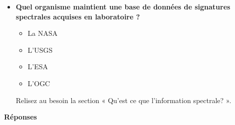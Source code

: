 \documentclass[
  french,
  11pt,
  letterpaper,
  open=any,
  twoside=false,
  french]{scrbook}
\providecommand{\tightlist}{%
  \setlength{\itemsep}{0pt}\setlength{\parskip}{0pt}}
\begin{document}
\begin{itemize}
  \begin{itemize}
  \tightlist
  \item
    Une généralisation de la couleur au-delà des bandes visibles
  \item
    Un histogramme des pixels de l'image
  \item
    La résolution spatiale du capteur
  \item
    Le niveau de bruit du capteur
  \end{itemize}

  Relisez au besoin la section « Qu'est ce que l'information spectrale?
  ».
\item
  \textbf{Quel organisme maintient une base de données de signatures
  spectrales acquises en laboratoire ?}

  \begin{itemize}
  \tightlist
  \item
    La NASA
  \item
    L'USGS
  \item
    L'ESA
  \item
    L'OGC
  \end{itemize}

  Relisez au besoin la section « Qu'est ce que l'information spectrale?
  ».
\end{itemize}

\textbf{Réponses}
\end{document}
